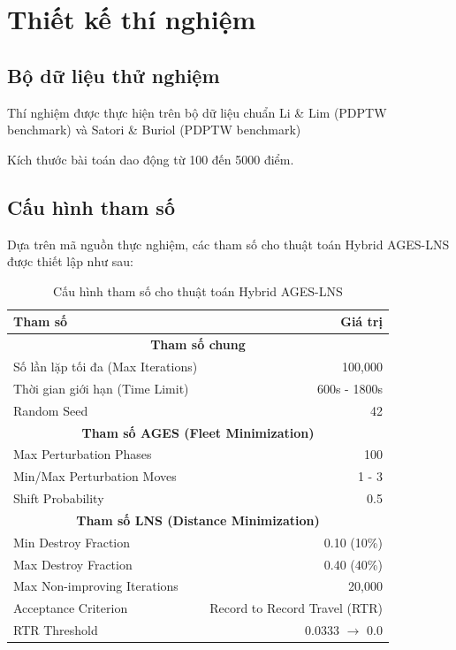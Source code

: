 \documentclass[../DoAn.tex]{subfiles}
\begin{document}
	\section{Thiết kế thí nghiệm}

	\subsection{Bộ dữ liệu thử nghiệm}

	Thí nghiệm được thực hiện trên bộ dữ liệu chuẩn Li \& Lim (PDPTW benchmark) và Satori \& Buriol (PDPTW benchmark) 

    Kích thước bài toán dao động từ 100 đến 5000 điểm.

	\subsection{Cấu hình tham số}

	Dựa trên mã nguồn thực nghiệm, các tham số cho thuật toán Hybrid AGES-LNS được thiết lập như sau:

	\begin{table}[h!]
		\centering
		\begin{tabular}{l r}
			\hline
			\textbf{Tham số}                           & \textbf{Giá trị} \\
			\hline
			\multicolumn{2}{c}{\textbf{Tham số chung}}    \\
			Số lần lặp tối đa (Max Iterations)         & 100,000          \\
			Thời gian giới hạn (Time Limit)            & 600s - 1800s     \\
			Random Seed                                & 42               \\
			\hline
			\multicolumn{2}{c}{\textbf{Tham số AGES (Fleet Minimization)}} \\
			Max Perturbation Phases                    & 100              \\
			Min/Max Perturbation Moves                 & 1 - 3            \\
			Shift Probability                          & 0.5              \\
			\hline
            \multicolumn{2}{c}{\textbf{Tham số LNS (Distance Minimization)}} \\
            Min Destroy Fraction                       & 0.10 (10\%)      \\
            Max Destroy Fraction                       & 0.40 (40\%)      \\
            Max Non-improving Iterations               & 20,000           \\
            Acceptance Criterion                       & Record to Record Travel (RTR) \\
            RTR Threshold                              & 0.0333 $\to$ 0.0 \\
			\hline
		\end{tabular}
		\caption{Cấu hình tham số cho thuật toán Hybrid AGES-LNS}
		\label{tab:ages_lns_params}
	\end{table}
\end{document}
